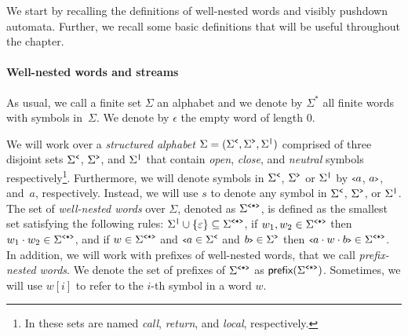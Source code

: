 
We start by recalling the definitions of well-nested words and visibly pushdown automata. Further, we recall some basic definitions that will be useful throughout the chapter. 

\paragraph{Well-nested words and streams} As usual, we call a finite set $\Sigma$ an alphabet and we denote by $\Sigma^*$ all finite words with symbols in~$\Sigma$.  We denote by $\epsilon$ the empty word of length $0$.

We will work over a {\em structured alphabet} $\Sigma = (\Sigma^{\texttt{<}}, \Sigma^{\texttt{>}}, \Sigma^{\texttt{|}})$ comprised of three disjoint sets $\Sigma^{\texttt{<}}$, $\Sigma^{\texttt{>}}$, and $\Sigma^{\texttt{|}}$ that contain {\it open}, {\it close}, and {\it neutral} symbols respectively\footnote{In \cite{AlurM04,FiliotRRST18} these sets are named \emph{call}, \emph{return}, and \emph{local}, respectively.}. 
Furthermore, we will denote symbols in $\Sigma^{\texttt{<}}$, $\Sigma^{\texttt{>}}$ or $\Sigma^{\texttt{|}}$ by ${\scriptsize\texttt{<}} a$, $a{\scriptsize\texttt{>}}$, and~$a$, respectively.
Instead, we will use $s$ to denote any symbol in $\Sigma^{\texttt{<}}$, $\Sigma^{\texttt{>}}$, or $\Sigma^{\texttt{|}}$.
The set of {\em well-nested words}
over $\Sigma$, denoted as $\Sigma^{\texttt{<*>}}$, is defined as the smallest set satisfying the following rules: 
$\Sigma^{\texttt{|}} \cup \{\varepsilon\} \subseteq \Sigma^{\texttt{<*>}}$,
if $w_1, w_2 \in \Sigma^{\texttt{<*>}}$ then $w_1 \cdot w_2 \in \Sigma^{\texttt{<*>}}$, and if $w \in \Sigma^{\texttt{<*>}}$ and ${\scriptsize\texttt{<}} a \in \Sigma^{\texttt{<}}$ and $b{\scriptsize\texttt{>}} \in \Sigma^{\texttt{>}}$ then ${\scriptsize\texttt{<}} a\cdot w\cdot b{\scriptsize\texttt{>}} \in \Sigma^{\texttt{<*>}}$. 
In addition, we will work with prefixes of well-nested words, that we call {\em prefix-nested words}. We denote the set of prefixes of $\Sigma^{\texttt{<*>}}$ as $\textsf{prefix}(\Sigma^{\texttt{<*>}})$.
Sometimes, we will use $w[i]$ to refer to the $i$-th symbol in a word $w$.

